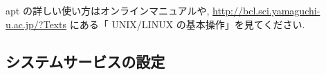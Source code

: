 \documentclass{jarticle}
\begin{document}
apt の詳しい使い方はオンラインマニュアルや,
\url{http://bcl.sci.yamaguchi-u.ac.jp/?Texts}
にある「 UNIX/LINUX の基本操作」を見てください.

%
%

\subsection{システムサービスの設定}\label{tab:SS}
\end{document}
